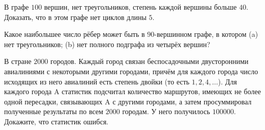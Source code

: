 \begin{problem}
	В графе $100$ вершин, нет треугольников, степень каждой вершины больше $40$. Доказать, что в этом графе нет циклов длины $5$.
\end{problem}

\begin{problem}
	Какое наибольшее число рёбер может быть в $90$-вершинном графе, в котором (a) нет треугольников; (b) нет полного подграфа из четырёх вершин?
\end{problem}

\begin{problem}
	В стране $2000$ городов. Каждый город связан беспосадочными двусторонними авиалиниями с некоторыми другими городами, причём для каждого города число исходящих из него авиалиний есть степень двойки (то есть $1, 2, 4, \ldots$). Для каждого города A статистик подсчитал количество маршрутов, имеющих не более одной пересадки, связывающих A с другими городами, а затем просуммировал полученные результаты по всем $2000$ городам. У него получилось $100000$. Докажите, что статистик ошибся.
\end{problem}

